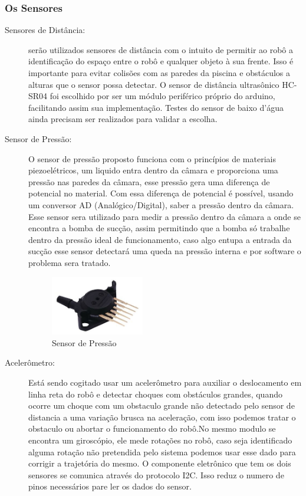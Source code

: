 \subsubsection{Os Sensores}
\begin{description}
\item[Sensores de Distância:] serão utilizados sensores de distância com o intuito de permitir ao robô a identificação do espaço entre o robô e qualquer objeto à sua frente. Isso é importante para evitar colisões com as paredes da piscina e obstáculos a alturas que o sensor possa detectar. O sensor de distância ultrasônico HC-SR04 foi escolhido  por ser um módulo periférico próprio do arduino, facilitando assim sua implementação. Testes do sensor de baixo d'água ainda precisam ser realizados para validar a escolha.
\item[Sensor de Pressão:] O sensor de pressão proposto funciona com o princípios de materiais piezoelétricos, um liquido entra dentro da câmara e proporciona uma pressão nas paredes da câmara, esse pressão gera uma diferença de potencial no material. Com essa diferença de potencial é possível, usando um conversor AD (Analógico/Digital), saber a pressão dentro da câmara. Esse sensor sera utilizado para medir a pressão dentro da câmara a onde se encontra a bomba de sucção, assim permitindo que a bomba só trabalhe dentro da pressão ideal de funcionamento, caso algo entupa a entrada da sucção esse sensor detectará  uma queda na pressão interna e por software o problema sera tratado.
\par
\begin{figure}[h]
  \centering
  \includegraphics[width=0.4\textwidth]{figures/pressure-sensor.png}
  \caption{Sensor de Pressão}
  \label{fig:a}
\end{figure}
\FloatBarrier
\par
\item[Acelerômetro:] Está sendo cogitado usar um acelerômetro para auxiliar o deslocamento em linha reta do robô e detectar choques com obstáculos grandes, quando ocorre um choque com um obstaculo grande não detectado pelo sensor de distancia a uma variação brusca na aceleração, com isso podemos tratar o obstaculo ou abortar o funcionamento do robô.No mesmo modulo se encontra um giroscópio, ele mede rotações no robô, caso seja identificado alguma rotação não pretendida pelo sistema podemos usar esse dado para corrigir a trajetória do mesmo. O componente eletrônico que tem os dois sensores se comunica através do protocolo I2C. Isso reduz o numero de pinos necessários pare ler os dados do sensor.

\end{description}

